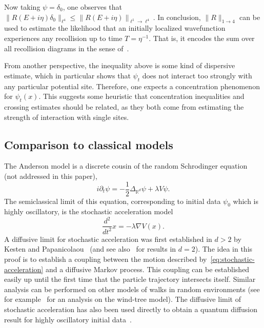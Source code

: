 \documentclass[11pt]{amsart}
\def\Real{{\mathbb R}}
\numberwithin{equation}{section}
\numberwithin{theorem}{section}
\begin{document}
Now taking $\psi = \delta_0$, one observes that $\|R(E+i\eta)\delta_0\|_{\ell^4} \leq \|R(E+i\eta)\|_{\ell^1\to\ell^4}$.  In conclusion, $\|R\|_{1\to 4}$ can be used to estimate the likelihood that an initially localized wavefunction experiences any recollision up to time $T=\eta^{-1}$.  That is, it encodes the sum over all recollision diagrams in the sense of~\cite{ESYrecollision}.

From another perspective, the inequality above is some kind of dispersive estimate, which in particular shows that $\psi_t$ does not interact
too strongly with any particular potential site.  Therefore, one expects a concentration phenomenon for $\psi_t(x)$.  This suggests some heuristic
that concentration inequalities and crossing estimates should be related, as they both come from estimating the strength of interaction with single
sites.


\subsection{Comparison to classical models}
\label{sec:classical}

The Anderson model is a discrete cousin of the random Schrodinger equation (not addressed in this paper),
\[
i\partial_t \psi = -\frac12 \Delta_{\Real^d} \psi + \lambda V\psi.
\]
The semiclassical limit of this equation, corresponding to initial data $\psi_0$ which is highly oscillatory,  is the stochastic acceleration model
\begin{equation}
\label{eq:stochastic-acceleration}
\frac{d^2}{dt^2} x = -\lambda \nabla V(x).
\end{equation}
A diffusive limit for stochastic acceleration was first established in $d>2$ by Kesten and Papanicolaou~\cite{kesten1980limit} (and see also~\cite{durr1987asymptotic,komorowski2006diffusion} for results in $d=2$).  The idea in this proof is to establish a coupling between the motion described
by~\eqref{eq:stochastic-acceleration} and a diffusive Markov process.  This coupling can be established easily up until the first time that the particle trajectory intersects itself.  Similar analysis can be performed on other models of walks in random environments (see for example~\cite{boldrighini1983boltzmann} for an analysis on the wind-tree model).
The diffusive limit of stochastic acceleration has also been used directly to obtain a quantum diffusion result for highly oscillatory initial data~\cite{bal2003self}.
\end{document}
